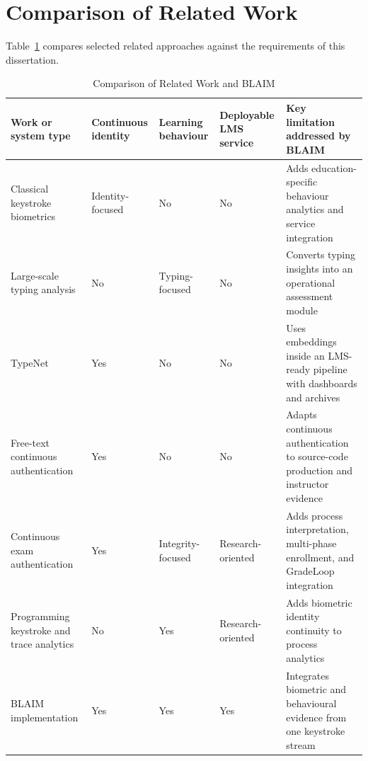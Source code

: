 \section{Comparison of Related Work}
\label{sec:comparison}

Table~\ref{tab:related-comparison} compares selected related approaches against the requirements of this dissertation.

\begin{table}[H]
  \centering
  \caption{Comparison of Related Work and BLAIM}
  \label{tab:related-comparison}
  \begin{singlespace}
  \begin{tabularx}{\textwidth}{@{}p{3.0cm}p{2.4cm}p{2.5cm}p{2.7cm}p{3.0cm}@{}}
    \toprule
    \textbf{Work or system type} & \textbf{Continuous identity} & \textbf{Learning behaviour} & \textbf{Deployable LMS service} & \textbf{Key limitation addressed by BLAIM} \\
    \midrule
    Classical keystroke biometrics \cite{monrose2000keystroke} & Identity-focused & No & No & Adds education-specific behaviour analytics and service integration \\
    Large-scale typing analysis \cite{dhakal2018observations} & No & Typing-focused & No & Converts typing insights into an operational assessment module \\
    TypeNet \cite{acien2022typenet} & Yes & No & No & Uses embeddings inside an LMS-ready pipeline with dashboards and archives \\
    Free-text continuous authentication \cite{alshehri2018iterative,lu2020continuous,yang2021tkca} & Yes & No & No & Adapts continuous authentication to source-code production and instructor evidence \\
    Continuous exam authentication \cite{senarath2023reevaluating} & Yes & Integrity-focused & Research-oriented & Adds process interpretation, multi-phase enrollment, and GradeLoop integration \\
    Programming keystroke and trace analytics \cite{arakawa2021situ,dong2021trace,edwards2020keystroke,edwards2023csedm} & No & Yes & Research-oriented & Adds biometric identity continuity to process analytics \\
    BLAIM implementation & Yes & Yes & Yes & Integrates biometric and behavioural evidence from one keystroke stream \\
    \bottomrule
  \end{tabularx}
  \end{singlespace}
\end{table}

